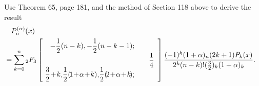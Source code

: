\begin{problem}\label{problem2chapter12}
Use Theorem 65, page 181, and the method of Section 118 above to derive the result
\begin{eqnarray*}
\lefteqn{P_n^{(\alpha)}(x)}\\
&& \!\!\!\!\!\!\!\!\!\!= \displaystyle\sum_{k=0}^n {}_2F_3 \left[ \begin{array}{rlr}
-\dfrac{1}{2}(n-k), -\dfrac{1}{2}(n-k-1); & & \\
& & \dfrac{1}{4} \\
\!\dfrac{3}{2}\!+\!k,\!\dfrac{1}{2}(\!1\!+\!\alpha\!+\!k),\!\dfrac{1}{2} (\!2\!+\!\alpha\!+\!k\!); & & 
\end{array} \right] \dfrac{(-1)^k (1 + \alpha)_n (2k+1) P_k(x)}{2^k (n-k)! (\frac{3}{2})_k (1+ \alpha)_k}.
\end{eqnarray*}
\end{problem}
